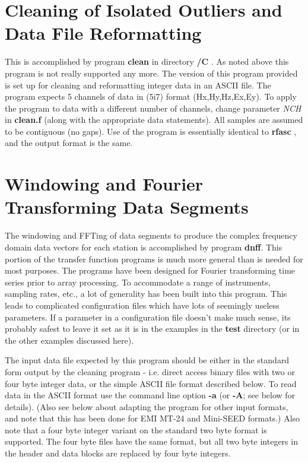 \section{Cleaning of Isolated Outliers and Data File Reformatting}

This is accomplished by program {\bf clean}
in directory {\bf /C} .  As noted above this program is not
really supported any more.
The version of this program provided is
set up for cleaning and
reformatting integer data in an ASCII file.
The program expects 5 channels of data in (5i7)
format (Hx,Hy,Hz,Ex,Ey).
To apply the program to data with a different number
of channels, change parameter {\it NCH} in {\bf clean.f}
(along with the appropriate data statements).
All samples are assumed to be contiguous (no gaps).
Use of the program is essentially identical to {\bf rfasc} ,
and the output format is the same.

\section{Windowing and Fourier Transforming Data Segments}

The windowing and FFTing of data segments to produce the
complex frequency domain data vectors for each station is
accomplished by program {\bf dnff}.
This portion of the transfer function programs is much more
general than is needed for most purposes.
The programs have been designed for Fourier transforming
time series prior to array processing.
To accommodate a range of instruments, sampling rates, etc.,
a lot of generality has been built into this program.
This leads to complicated configuration files which have lots
of seemingly useless parameters.
If a parameter in a configuration file doesn't make much sense, its
probably safest to leave it set as it is in the examples in
the {\bf test} directory (or in the other examples discussed here).

The input data file expected by this program should be
either in the standard form output
by the cleaning program - i.e. direct access binary files
with two or four byte integer data, or the simple ASCII file format
described below.  To read data in the ASCII format use the command line
option {\bf -a} (or {\bf -A}; see below for details).
(Also see below about adapting the program for other input formats,
and note that this has been done for EMI MT-24 and Mini-SEED formats.)
Also note that a four byte integer variant on the standard two byte
format is supported.  The four byte files have the same format,
but all two byte integers in the header and data
blocks are replaced by four byte integers.

